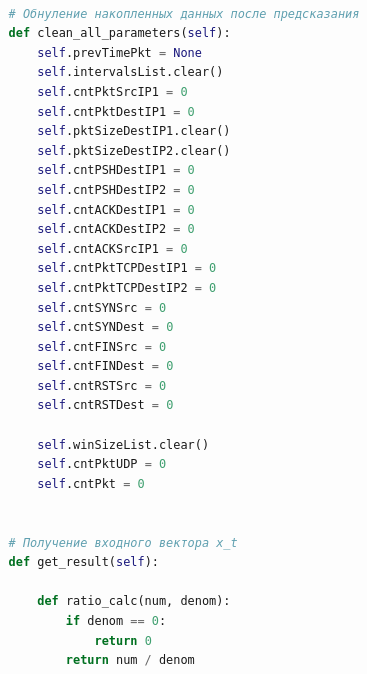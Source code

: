 \documentclass[bachelor, och, coursework]{SCWorks}
\begin{document}
\begin{lstlisting}[language=Python]
      
          # Обнуление накопленных данных после предсказания
          def clean_all_parameters(self):
              self.prevTimePkt = None
              self.intervalsList.clear()
              self.cntPktSrcIP1 = 0
              self.cntPktDestIP1 = 0
              self.pktSizeDestIP1.clear()
              self.pktSizeDestIP2.clear()
              self.cntPSHDestIP1 = 0
              self.cntPSHDestIP2 = 0
              self.cntACKDestIP1 = 0
              self.cntACKDestIP2 = 0
              self.cntACKSrcIP1 = 0
              self.cntPktTCPDestIP1 = 0
              self.cntPktTCPDestIP2 = 0
              self.cntSYNSrc = 0
              self.cntSYNDest = 0
              self.cntFINSrc = 0
              self.cntFINDest = 0
              self.cntRSTSrc = 0
              self.cntRSTDest = 0
              
              self.winSizeList.clear()
              self.cntPktUDP = 0
              self.cntPkt = 0
      
      
          # Получение входного вектора x_t
          def get_result(self):
              
              def ratio_calc(num, denom):
                  if denom == 0:
                      return 0
                  return num / denom
      

\end{lstlisting}
\end{document}
